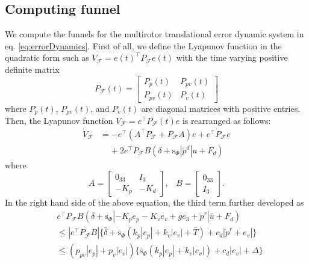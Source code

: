 \documentclass[letterpaper, 10 pt, conference]{ieeeconf}  %
\begin{document}
\subsection{Computing funnel}
We compute the funnels for the multirotor translational error dynamic system in eq. \eqref{eq:errorDynamics}.
First of all, 
we define the Lyapunov function in the quadratic form such as $V_\mathcal{F} = e(t)^\top P_\mathcal{F} e(t)$ with the time varying positive definite matrix
\begin{equation}
P_\mathcal{F}(t) = \left[
\begin{array}{cc}
P_p(t) & P_{pv}(t) \\
P_{pv}(t) & P_v(t)
\end{array}
\right] \nonumber
\end{equation}
where $P_p(t)$, $P_{pv}(t)$, and $P_v(t)$ are diagonal matrices with positive entries.
Then, the Lyapunov function $V_\mathcal{F} = e^\top P_\mathcal{F}(t) e$ is rearranged as follows: 
\begin{align}
\dot{V}_\mathcal{F} &= -e^\top ( A^\top P_\mathcal{F} + P_\mathcal{F}A) e + e^\top \dot{P}_\mathcal{F} e \nonumber \\
&\;\;\;\;+2e^\top P_\mathcal{F} B (\delta+\text{s}_\Phi|\ddot{p}^d|{u}+F_d) \nonumber
\end{align}
where
\begin{equation}
A = \left[
\begin{array}{rr}
0_{33} & I_3 \\ -K_p & -K_d 
\end{array}
\right],\;\;\;B = \left[
\begin{array}{r}
0_{33} \\ I_3
\end{array}
\right].\nonumber 
\end{equation}
In the right hand side of the above equation, the third term further developed as
\begin{align}
&e^\top P_\mathcal{F} B(\delta+\text{s}_\Phi|-K_p e_p -K_v e_v + ge_3 + \ddot{p}^r|\bar{u}+F_d) \nonumber \\
&\leq |e^\top P_\mathcal{F}B|\{\bar{\delta} + \bar{\text{s}}_\Phi(k_p|e_p| + k_v|e_v| + \bar{T})+c_d|\dot{p}^r+e_v|\} \nonumber \\
&\leq (p_{pv}|e_p|+p_v|e_v|)\{\bar{\text{s}}_\Phi(k_p|e_p|+k_v|e_v|)+c_d|e_v|+\Delta\} \label{eq:normAnalysis}
\end{align}
\end{document}
